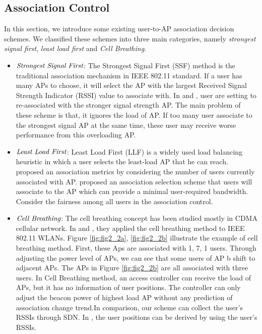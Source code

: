 \subsection{Association Control}
In this section, we introduce some existing user-to-AP association decision schemes. We classified these schemes into three main categories, namely \emph{strongest signal first}, \emph{least load first} and \emph{Cell Breathing}.

\begin{itemize}
  \item $\emph{Strongest Signal First}$: The Strongest Signal First (SSF) method is the traditional association mechanism in IEEE 802.11 standard. If a user has many APs to choose, it will select the AP with the largest Received Signal Strength Indicator (RSSI) value to associate with. In \cite{teng2009d} and \cite{wu2007proactive}, user are setting to re-associated with the stronger signal strength AP. The main problem of these scheme is that, it ignores the load of AP. If too many user associate to the strongest signal AP at the same time, these user may receive worse performance from this overloading AP.
  \item $\emph{Least Load First}$: Least Load First (LLF) is a widely used load balancing heuristic in which a user selects the least-load AP that he can reach. \cite{papanikos2001study} proposed an association metrics by considering the number of users currently associated with AP. \cite{balachandran2002hot} proposed an association selection scheme that users will associate to the AP which can provide a minimal user-required bandwidth. \cite{bejerano2004fairness} Consider the fairness among all users in the association control.
  \item $\emph{Cell Breathing}$: The cell breathing concept has been studied mostly in CDMA cellular network. In \cite{bahl2007cell} and \cite{bejerano2009cell}, they applied the cell breathing method to IEEE 802.11 WLANs. Figure \ref{fig:fig2_2a}, \ref{fig:fig2_2b} illustrate the example of cell breathing method. First, these Aps are associated with 1, 7, 1 users. Through adjusting the power level of APs, we can see that some users of AP b shift to adjacent APs. The APs in Figure \ref{fig:fig2_2b} are all associated with three users.
      In Cell Breathing method, an access controller can receive the load of APs, but it has no information of user positions. The controller can only adjust the beacon power of highest load AP without any prediction of association change trend.In comparison, our scheme can collect the user's RSSIs through SDN. In \cite{zaruba2007indoor}, the user positions can be derived by using the user's RSSIs.
\end{itemize}

